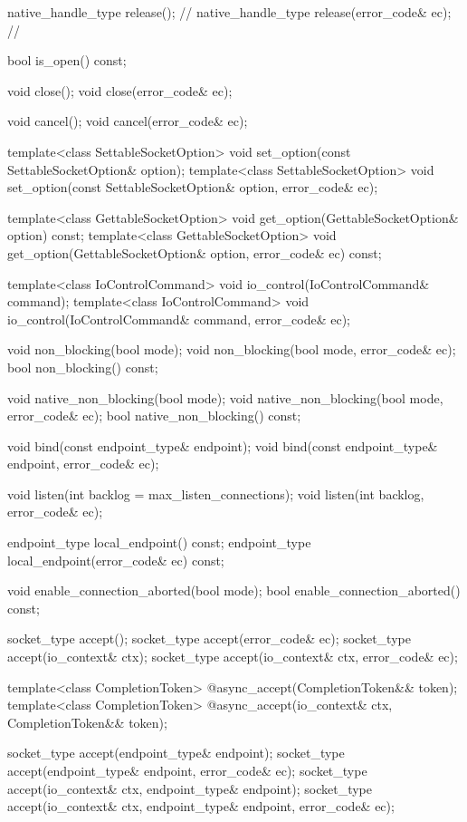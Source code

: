 \begin{codeblock}
{{{{{    native_handle_type release(); // \nativeref
    native_handle_type release(error_code& ec); // \nativeref

    bool is_open() const;

    void close();
    void close(error_code& ec);

    void cancel();
    void cancel(error_code& ec);

    template<class SettableSocketOption>
      void set_option(const SettableSocketOption& option);
    template<class SettableSocketOption>
      void set_option(const SettableSocketOption& option, error_code& ec);

    template<class GettableSocketOption>
      void get_option(GettableSocketOption& option) const;
    template<class GettableSocketOption>
      void get_option(GettableSocketOption& option, error_code& ec) const;

    template<class IoControlCommand>
      void io_control(IoControlCommand& command);
    template<class IoControlCommand>
      void io_control(IoControlCommand& command, error_code& ec);

    void non_blocking(bool mode);
    void non_blocking(bool mode, error_code& ec);
    bool non_blocking() const;

    void native_non_blocking(bool mode);
    void native_non_blocking(bool mode, error_code& ec);
    bool native_non_blocking() const;

    void bind(const endpoint_type& endpoint);
    void bind(const endpoint_type& endpoint, error_code& ec);

    void listen(int backlog = max_listen_connections);
    void listen(int backlog, error_code& ec);

    endpoint_type local_endpoint() const;
    endpoint_type local_endpoint(error_code& ec) const;

    void enable_connection_aborted(bool mode);
    bool enable_connection_aborted() const;

    socket_type accept();
    socket_type accept(error_code& ec);
    socket_type accept(io_context& ctx);
    socket_type accept(io_context& ctx, error_code& ec);

    template<class CompletionToken>
      @\DEDUCED@ async_accept(CompletionToken&& token);
    template<class CompletionToken>
      @\DEDUCED@ async_accept(io_context& ctx, CompletionToken&& token);

    socket_type accept(endpoint_type& endpoint);
    socket_type accept(endpoint_type& endpoint, error_code& ec);
    socket_type accept(io_context& ctx, endpoint_type& endpoint);
    socket_type accept(io_context& ctx, endpoint_type& endpoint,
                       error_code& ec);

}}}}}
\end{codeblock}
